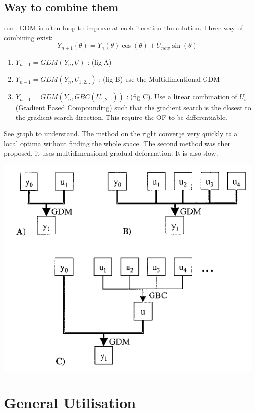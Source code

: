 \documentclass{article}
\newenvironment{Figure}
  {\par\medskip\noindent\minipage{\linewidth}}
  {\endminipage\par\medskip}
\begin{document}
\begin{multicols}{2}
\subsection{Way to combine them}
see \cite{Hu2004}.
GDM is often loop to improve at each iteration the solution. Three way of combining exist:
\[ Y_{n+1}(\theta)  = Y_{n}(\theta) \cos (\theta)  + U_{new} \sin (\theta)\]
\begin{enumerate}
\item $Y_{n+1} = GDM(Y_{n}, U)$ : (fig A)
\item $Y_{n+1} = GDM(Y_{n}, U_{1, 2...})$ : (fig B) use the Multidimentional GDM
\item $Y_{n+1} = GDM(Y_{n}, GBC(U_{1, 2...}))$ : (fig C). Use a linear combination of $U_i$ (Gradient Based Compounding) such that the gradient search is the closest to the gradient search direction. This require the OF to be differentiable.
\end{enumerate}
See graph to understand. The method on the right converge very quickly to a local optima without finding the whole space. The second method was then proposed, it uses multidimensional gradual deformation. It is also slow.

\begin{Figure}
 \centering
 \includegraphics[width=\linewidth]{grad_def_ex_12}
\end{Figure}




\section{General Utilisation}

\end{multicols}
\end{document}

